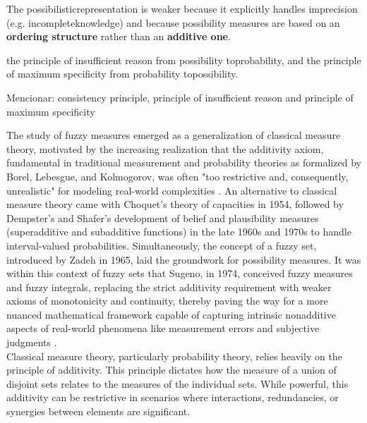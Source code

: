 {The possibilisticrepresentation is weaker because it explicitly handles imprecision (e.g. incompleteknowledge) and because possibility measures are based on an \textbf{ordering structure} rather than an \textbf{additive one}.

the principle of insufficient reason from possibility toprobability, and the principle of maximum specificity from probability topossibility.

Mencionar: consistency principle, principle of insufficient reason and principle of maximum specificity
}








The study of fuzzy measures emerged as a generalization of classical measure theory, motivated by the increasing realization that the additivity axiom, fundamental in traditional measurement and probability theories as formalized by Borel, Lebesgue, and Kolmogorov, was often "too restrictive and, consequently, unrealistic" for modeling real-world complexities \cite[p.~10]{FuzzyMeasureHistory}. An alternative to classical measure theory came with Choquet's theory of capacities in 1954, followed by Dempster's and Shafer's development of belief and plausibility measures (superadditive and subadditive functions) in the late 1960s and 1970s to handle interval-valued probabilities. Simultaneously, the concept of a fuzzy set, introduced by Zadeh in 1965, laid the groundwork for possibility measures. It was within this context of fuzzy sets that Sugeno, in 1974, conceived fuzzy measures and fuzzy integrals, replacing the strict additivity requirement with weaker axioms of monotonicity and continuity, thereby paving the way for a more nuanced mathematical framework capable of capturing intrinsic nonadditive aspects of real-world phenomena like measurement errors and subjective judgments \cite[p.~13]{FuzzyMeasureHistory}.\\

Classical measure theory, particularly probability theory, relies heavily on the principle of additivity. This principle dictates how the measure of a union of disjoint sets relates to the measures of the individual sets. While powerful, this additivity can be restrictive in scenarios where interactions, redundancies, or synergies between elements are significant.

